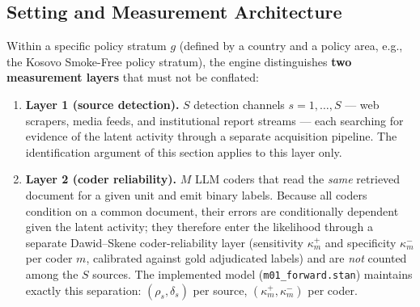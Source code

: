 \documentclass[11pt,a4paper]{article}
\begin{document}
\subsection{Setting and Measurement Architecture}
Within a specific policy stratum $g$ (defined by a country and a policy area, e.g., the Kosovo Smoke-Free policy stratum), the engine distinguishes \textbf{two measurement layers} that must not be conflated:
\begin{enumerate}
    \item \textbf{Layer 1 (source detection).} $S$ detection channels $s = 1, \dots, S$ --- web scrapers, media feeds, and institutional report streams --- each searching for evidence of the latent activity through a separate acquisition pipeline. The identification argument of this section applies to this layer only. %
    \item \textbf{Layer 2 (coder reliability).} $M$ LLM coders that read the \emph{same} retrieved document for a given unit and emit binary labels. Because all coders condition on a common document, their errors are conditionally dependent given the latent activity; they therefore enter the likelihood through a separate Dawid--Skene coder-reliability layer (sensitivity $\kappa^+_m$ and specificity $\kappa^-_m$ per coder $m$, calibrated against gold adjudicated labels) and are \emph{not} counted among the $S$ sources. The implemented model (\texttt{m01\_forward.stan}) maintains exactly this separation: $(\rho_s, \delta_s)$ per source, $(\kappa^+_m, \kappa^-_m)$ per coder. %
\end{enumerate}
\end{document}
